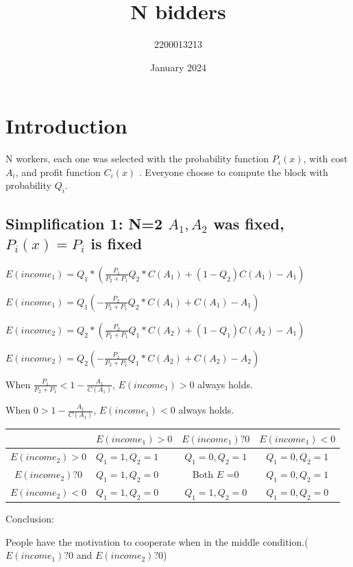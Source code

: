 \documentclass{article}
\title{N bidders}
\author{2200013213 }
\date{January 2024}
\begin{document}
\maketitle

\section{Introduction}
\par N workers, each one was selected with the probability function $P_i(x)$, with cost $A_i$, and profit function $C_i(x)$ . Everyone choose to compute the block with probability $Q_i$.
\subsection{Simplification 1: N=2 $A_1,A_2$ was fixed, $P_i(x)=P_i$ is fixed}
\par$E(income_1)=Q_1*(\frac{P_1}{P_2+P_1}Q_2*C(A_1)+(1-Q_2)C(A_1)-A_1)$
\par$E(income_1)=Q_1(-\frac{P_2}{P_2+P_1}Q_2*C(A_1)+C(A_1)-A_1)$
\par$E(income_2)=Q_2*(\frac{P_2}{P_2+P_1}Q_1*C(A_2)+(1-Q_1)C(A_2)-A_1)$
\par$E(income_2)=Q_2(-\frac{P_1}{P_2+P_1}Q_1*C(A_2)+C(A_2)-A_2)$
\par When $\frac{P_1}{P_2+P_1}<1-\frac{A_1}{C(A_1)}$, $E(income_1)>0$ always holds.
\par When $0>1-\frac{A_1}{C(A_1)}$, $E(income_1)<0$ always holds.

\begin{table}
    \centering


    \begin{tabular}{|c|l|c|c|} \hline 
  &$E(income_1)>0$& $E(income_1)?0$&$E(income_1)<0$\\ \hline 
          $E(income_2)>0$&$Q_1=1,Q_2=1$&$Q_1=0,Q_2=1$& $Q_1=0,Q_2=1$\\ \hline 
          $E(income_2)?0$&$Q_1=1,Q_2=0$&  Both $E$ =0& $Q_1=0,Q_2=1$\\ \hline 
          $E(income_2)<0$&$Q_1=1,Q_2=0$&  $Q_1=1,Q_2=0$& $Q_1=0,Q_2=0$\\ \hline
    \end{tabular}
    
    
\end{table}
Conclusion:
\par People have the motivation to cooperate when in the middle condition.($E(income_1)?0$ and $E(income_2)?0$)
\end{document}
